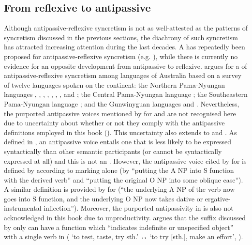 \subsection{From reflexive to antipassive} \label{diachrony:refl2antp}
Although antipassive-reflexive syncretism is not as well-attested as the patterns of syncretism discussed in the previous sections, the diachrony of such syncretism has attracted increasing attention during the last decades. A  has repeatedly been proposed for antipassive-reflexive syncretism (e.g. \citealt{terrill:1997, janic:2010, sanso:2017, sanso:2018}), while there is currently no evidence for an opposite development from antipassive to reflexive. \cite{terrill:1997} argues for a  of antipassive-reflexive syncretism among languages of Australia based on a survey of twelve languages spoken on the continent: the Northern Pama-Nyungan languages , , , , , , , and ; the Central Pama-Nyungan language ; the Southeastern Pama-Nyungan language ; and the Gunwinyguan languages  and . Nevertheless, the purported antipassive voices mentioned by \citeauthor{terrill:1997} for  and  are not recognised here due to uncertainty about whether or not they comply with the antipassive definitions employed in this book (). This uncertainty also extends to  and . As defined in , an antipassive voice entails one  that is less likely to be expressed syntactically than other semantic participants (or cannot be syntactically expressed at all) and this  is not an . However, the antipassive voice cited by \citeauthor{terrill:1997} for  is defined by \cite[128]{haviland:1979} according to  marking alone (by “putting the A NP into S function with the derived verb” and “putting the original O NP into some oblique case”). A similar definition is provided by \cite[496]{dixon:1983} for  (“the underlying A NP of the verb now goes into S function, and the underlying O NP now takes dative or ergative-instrumental inflection”). Moreover, the purported antipassivity in  is also not acknowledged in this book due to unproductivity. \cite{heath:1978} argues that the suffix  discussed by \cite{terrill:1997} only can have a function which “indicates indefinite or unspecified object” with a single verb in  ( ‘to test, taste, try sth.’ ↔  ‘to try [sth.], make an effort’, \citealt[92]{heath:1978}).

